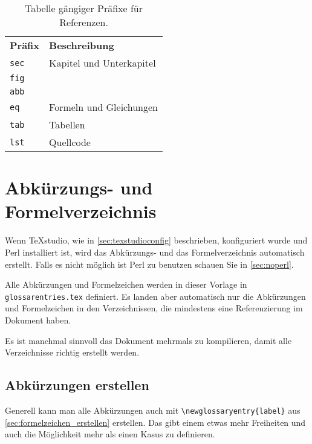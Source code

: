 \begin{table}[h]
	\centering
	\caption{Tabelle gängiger Präfixe für Referenzen.}
	\label{tab:refprefixlabel}
	\begin{tabular}{@{}C{2cm}L{5.5cm}@{}}
		{\color[HTML]{FFFFFF} \textbf{Präfix}} & {\color[HTML]{FFFFFF} \textbf{Beschreibung}}\\
		
		\verb|sec| & Kapitel und Unterkapitel\\
		
		\verb|fig| & \\
		\verb|abb| &  \\ 
		
		\verb|eq|  & Formeln und Gleichungen\\
		
		\verb|tab| & Tabellen\\
		
		\verb|lst| & Quellcode
	\end{tabular}
\end{table}

\section{Abkürzungs- und Formelverzeichnis}
Wenn TeXstudio, wie in \autoref{sec:texstudioconfig} beschrieben, konfiguriert wurde und Perl installiert ist, wird das Abkürzungs- und das Formelverzeichnis automatisch erstellt. Falls es nicht möglich ist Perl zu benutzen schauen Sie in \autoref{sec:noperl}.

Alle Abkürzungen und Formelzeichen werden in dieser Vorlage in \verb|glossarentries.tex| definiert. Es landen aber automatisch nur die Abkürzungen und Formelzeichen in den Verzeichnissen, die mindestens eine Referenzierung im Dokument haben.

Es ist manchmal sinnvoll das Dokument mehrmals zu kompilieren, damit alle Verzeichnisse richtig erstellt werden.

\subsection{Abkürzungen erstellen}
Generell kann man alle Abkürzungen auch mit \verb|\newglossaryentry{label}| aus \autoref{sec:formelzeichen_erstellen} erstellen. Das gibt einem etwas mehr Freiheiten und auch die Möglichkeit mehr als einen Kasus zu definieren.

